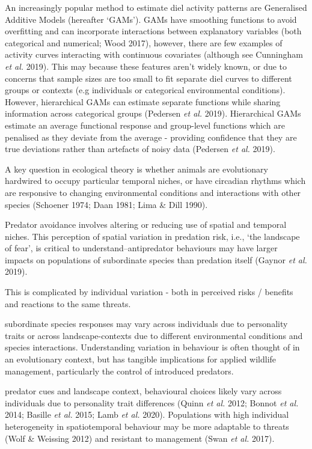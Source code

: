 \documentclass[11pt,a4paper,titlepage,twoside,openright]{style/unimelbthesis}
\begin{document}
\begin{mainmatter}
An increasingly popular method to estimate diel activity patterns are Generalised Additive Models (hereafter `GAMs'). GAMs have smoothing functions to avoid overfitting and can incorporate interactions between explanatory variables (both categorical and numerical; Wood 2017), however, there are few examples of activity curves interacting with continuous covariates (although see Cunningham \emph{et al.} 2019). This may because these features aren't widely known, or due to concerns that sample sizes are too small to fit separate diel curves to different groups or contexts (e.g individuals or categorical environmental conditions). However, hierarchical GAMs can estimate separate functions while sharing information across categorical groups (Pedersen \emph{et al.} 2019). Hierarchical GAMs estimate an average functional response and group-level functions which are penalised as they deviate from the average - providing confidence that they are true deviations rather than artefacts of noisy data (Pedersen \emph{et al.} 2019).

A key question in ecological theory is whether animals are evolutionary hardwired to occupy particular temporal niches, or have circadian rhythms which are responsive to changing environmental conditions and interactions with other species (Schoener 1974; Daan 1981; Lima \& Dill 1990).

Predator avoidance involves altering or reducing use of spatial and temporal niches.
This perception of spatial variation in predation risk, i.e., `the landscape of fear', is critical to understand--antipredator behaviours may have larger impacts on populations of subordinate species than predation itself (Gaynor \emph{et al.} 2019).

This is complicated by individual variation - both in perceived risks / benefits and reactions to the same threats.

subordinate species responses may vary across individuals due to personality traits or across landscape-contexts due to different environmental conditions and species interactions. Understanding variation in behaviour is often thought of in an evolutionary context, but has tangible implications for applied wildlife management, particularly the control of introduced predators.

predator cues and landscape context, behavioural choices likely vary across individuals due to personality trait differences (Quinn \emph{et al.} 2012; Bonnot \emph{et al.} 2014; Basille \emph{et al.} 2015; Lamb \emph{et al.} 2020). Populations with high individual heterogeneity in spatiotemporal behaviour may be more adaptable to threats (Wolf \& Weissing 2012) and resistant to management (Swan \emph{et al.} 2017).


\end{mainmatter}
\end{document}
